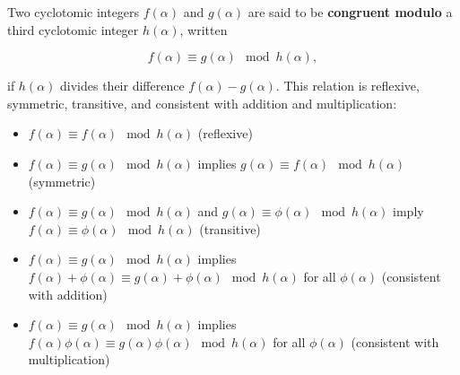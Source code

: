 Two cyclotomic integers $f(\alpha)$ and $g(\alpha)$ are said to be \textbf{congruent modulo} a third cyclotomic integer $h(\alpha)$, written

$$f(\alpha) \equiv g(\alpha) \mod h(\alpha),$$

if $h(\alpha)$ divides their difference $f(\alpha) - g(\alpha)$. This relation is reflexive, symmetric, transitive, and consistent with addition and multiplication:

\begin{itemize}
\item $f(\alpha) \equiv f(\alpha) \mod h(\alpha)$ \quad (reflexive)
\item $f(\alpha) \equiv g(\alpha) \mod h(\alpha)$ implies $g(\alpha) \equiv f(\alpha) \mod h(\alpha)$ \quad (symmetric)
\item $f(\alpha) \equiv g(\alpha) \mod h(\alpha)$ and $g(\alpha) \equiv \phi(\alpha) \mod h(\alpha)$ imply $f(\alpha) \equiv \phi(\alpha) \mod h(\alpha)$ \quad (transitive)
\item $f(\alpha) \equiv g(\alpha) \mod h(\alpha)$ implies $f(\alpha) + \phi(\alpha) \equiv g(\alpha) + \phi(\alpha) \mod h(\alpha)$ for all $\phi(\alpha)$ \quad (consistent with addition)
\item $f(\alpha) \equiv g(\alpha) \mod h(\alpha)$ implies $f(\alpha)\phi(\alpha) \equiv g(\alpha)\phi(\alpha) \mod h(\alpha)$ for all $\phi(\alpha)$ \quad (consistent with multiplication)
\end{itemize}